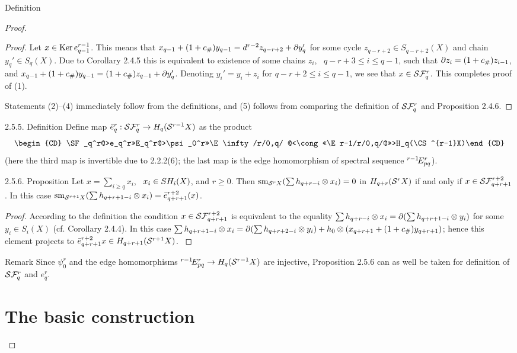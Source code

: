\documentclass{article}
\begin{document}
\begin{subsubsection}{ Definition}
\begin{proof}
{\begin{proof}
{Let $x\in\operatorname{Ker} e_{q-1}^{r-1}$. This means that 
$x_{q-1}+(1+c_\#)y_{q-1}=d^{r-2}z_{q-r+2}+\partial y_q'$ for some cycle
$z_{q-r+2}\in S_{q-r+2}(X)$ and chain $y_q'\in S_q(X)$. Due to Corollary 2.4.5
this is equivalent to existence of some chains $z_i$, \ $q-r+3\le i\le q-1$,
such that $\partial z_i=(1+c_\#)z_{i-1}$, and
$x_{q-1}+(1+c_\#)y_{q-1}=(1+c_\#)z_{q-1}+\partial y_q'$.
Denoting $y_i'=y_i+z_i$ for $q-r+2\le i\le q-1$,
we see that $x\in\mathcal S\mathcal F_q^r$. This completes proof of (1).

Statements (2)--(4) immediately follow from the definitions,
and (5) follows from comparing the definition of
$\mathcal S\mathcal F_q^r$ and Proposition 2.4.6. 
}\end{proof}
\begin{definition}{{2.5.5. Definition} Define map
$\bar e_q^r:\mathcal S\mathcal F_q^r\to H_q(\mathcal S^{r-1}X)$ as the product
$$\begin{CD}
\SF_q^r@>e_q^r>>E_q^r@>\psi_0^r>>\E\infty/r/0,q/
@<\cong<<\E r-1/r/0,q/@>>>H_q(\CS^{r-1}X)\end{CD}
$$
(here the third map is invertible due to 2.2.2(6); the last map is the edge
homomorphism of spectral sequence $\E r-1/r/pq/$).
}\end{definition}
\begin{proclaim}{{2.5.6. Proposition} Let $x=\sum\limits_{i\ge q}x_i$, \
$x_i\in SH_i(X)$, and $r\ge0$. Then
$\operatorname{sm}_{\mathcal S^rX}(\sum h_{q+r-i}\otimes x_i)=0$ in $H_{q+r}(\mathcal S^rX)$
if and only if $x\in\mathcal S\mathcal F_{q+r+1}^{r+2}$. In this case
$\operatorname{sm}_{\mathcal S^{r+1}X}(\sum h_{q+r+1-i}\otimes x_i)=\bar e_{q+r+1}^{r+2}(x)$.
}\end{proclaim}
\begin{proof}{ According to the definition the condition
$x\in\mathcal S\mathcal F_{q+r+1}^{r+2}$ is equivalent to the equality
$\sum h_{q+r-i}\otimes x_i=\partial(\sum h_{q+r+1-i}\otimes y_i)$ for some
$y_i\in S_i(X)$ (cf. Corollary 2.4.4). In this case
$\sum h_{q+r+1-i}\otimes x_i=\partial(\sum h_{q+r+2-i}\otimes y_i)+
h_0\otimes(x_{q+r+1}+(1+c_\#)y_{q+r+1})$; hence this element
projects to $\bar e_{q+r+1}^{r+2}x\in H_{q+r+1}(\mathcal S^{r+1}X)$. 
}\end{proof}
\begin{remark}{{Remark} Since $\psi_0^r$ and the edge homomorphisms
$\E r-1/r/pq/\to H_q(\CS^{r-1}X)$ are injective, Proposition 2.5.6 can
as well be taken for definition of $\mathcal S\mathcal F_q^r$ and $e_q^r$.
}\end{remark}
%

%
\section{The basic construction }
}
\end{proof}
\end{subsubsection}
\end{document}
